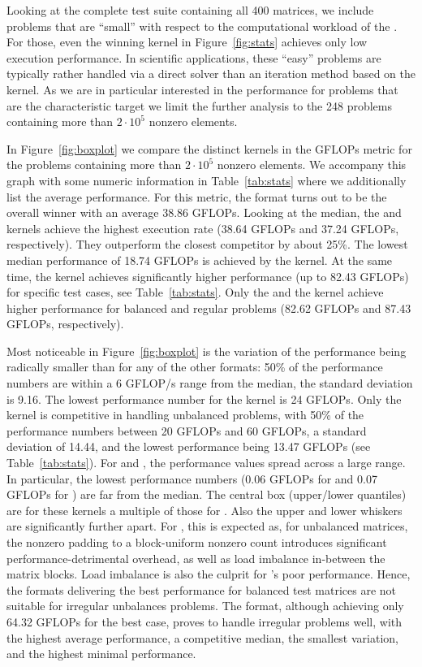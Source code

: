 Looking at the complete test suite containing all 400 matrices, 
we include problems that are ``small'' with respect to the computational workload of the \spmv.
For those, even the winning kernel in Figure~\ref{fig:stats} achieves 
only low execution performance. 
In scientific applications, these ``easy'' problems are typically rather handled via a direct solver
than an iteration method based on the \spmv kernel.
As we are in particular interested in the performance for problems 
that are the characteristic target we limit the further analysis to the 248 
problems containing more than $2\cdot 10^5$ nonzero elements.

In Figure~\ref{fig:boxplot} we compare the distinct \spmv kernels in the GFLOPs 
metric for the problems containing more than $2\cdot 10^5$ nonzero elements.
We accompany this graph with some numeric information in 
Table~\ref{tab:stats} where we additionally 
list the average performance. 
For this metric, the \coo format turns out to be the
overall winner with an average 38.86 GFLOPs.
Looking at the median, the \sellp and \coo kernels 
achieve the highest execution rate (38.64 GFLOPs and 37.24 GFLOPs, respectively).
They outperform the closest competitor \csr by about 25\%.
The lowest median performance of 18.74 GFLOPs is achieved by the \hyb kernel.
At the same time, the \hyb kernel achieves significantly higher performance 
(up to 82.43 GFLOPs) for specific test cases, see Table~\ref{tab:stats}.
Only the \sellp and the \csr kernel achieve higher performance for balanced and regular 
problems (82.62 GFLOPs and 87.43 GFLOPs, respectively).

Most noticeable in Figure~\ref{fig:boxplot} 
is the variation of the \coo performance being radically smaller than
for any of the other formats: 
50\% of the performance numbers are within a 6 GFLOP/s range from the median,
the standard deviation is 9.16. 
The lowest performance number for the \coo kernel is 24 GFLOPs.
Only the \csri kernel is competitive in handling unbalanced problems,
with 50\% of the performance numbers between 20 GFLOPs and 60 GFLOPs,
a standard deviation of 14.44, and the lowest performance being 13.47 GFLOPs 
(see Table~\ref{tab:stats}).
For \sellp and \csr, the performance values spread across a large range.
In particular, 
the lowest performance numbers (0.06 GFLOPs for \sellp and 0.07 GFLOPs for \csr) 
are far from the median. 
The central box (upper/lower quantiles)
are for these kernels a multiple of those for \coo. 
Also the upper and lower whiskers are significantly further apart.
For \sellp, this is expected as, for unbalanced matrices, the nonzero padding to a
block-uniform nonzero count introduces significant performance-detrimental
overhead, as well as load imbalance in-between the matrix blocks.
Load imbalance is also the culprit for \csr's poor performance.
Hence, the formats delivering the best performance for balanced test matrices
are not suitable for irregular unbalances problems.
The \coo format, although achieving only 64.32 GFLOPs for the best case,
proves to handle irregular problems well, with the highest average performance,
a competitive median, the smallest
variation, and the highest minimal performance.

